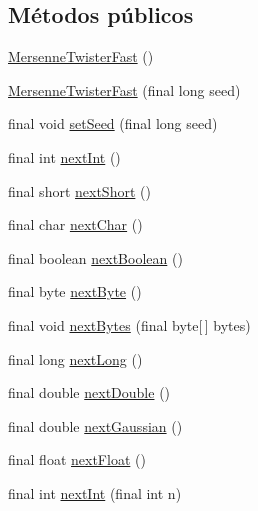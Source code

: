 \subsection*{Métodos públicos}
\begin{DoxyCompactItemize}
\item 
\hyperlink{classjenes_1_1utils_1_1_mersenne_twister_fast_a7321af0f92bcda7c245ebfbb647f7e4c}{Mersenne\-Twister\-Fast} ()
\item 
\hyperlink{classjenes_1_1utils_1_1_mersenne_twister_fast_a554aee5d390bb57ad30577b194c8b7b2}{Mersenne\-Twister\-Fast} (final long seed)
\item 
final void \hyperlink{classjenes_1_1utils_1_1_mersenne_twister_fast_aa44ca1bf8e9a2f272e248ea279f1e80c}{set\-Seed} (final long seed)
\item 
final int \hyperlink{classjenes_1_1utils_1_1_mersenne_twister_fast_a063b45fa6e20a5eea9acbe45a8c48ce0}{next\-Int} ()
\item 
final short \hyperlink{classjenes_1_1utils_1_1_mersenne_twister_fast_a89d03c5b1815eff8c443ef081a869e78}{next\-Short} ()
\item 
final char \hyperlink{classjenes_1_1utils_1_1_mersenne_twister_fast_a8f7cb8ea9832581729660f5c0346ee3a}{next\-Char} ()
\item 
final boolean \hyperlink{classjenes_1_1utils_1_1_mersenne_twister_fast_a54fa48ab055886a90aefdcb816257f4b}{next\-Boolean} ()
\item 
final byte \hyperlink{classjenes_1_1utils_1_1_mersenne_twister_fast_a5e7c0943fcc746a30277f0e09abbf60f}{next\-Byte} ()
\item 
final void \hyperlink{classjenes_1_1utils_1_1_mersenne_twister_fast_a237dc55841fd8bf544106d052833c374}{next\-Bytes} (final byte\mbox{[}$\,$\mbox{]} bytes)
\item 
final long \hyperlink{classjenes_1_1utils_1_1_mersenne_twister_fast_a1de4f36e5e4035569bbb79bb06d4e9c7}{next\-Long} ()
\item 
final double \hyperlink{classjenes_1_1utils_1_1_mersenne_twister_fast_a64238ab497c1e504c798355f682ea2b9}{next\-Double} ()
\item 
final double \hyperlink{classjenes_1_1utils_1_1_mersenne_twister_fast_a4af0dd9a4366e476e4d45568cbb558e9}{next\-Gaussian} ()
\item 
final float \hyperlink{classjenes_1_1utils_1_1_mersenne_twister_fast_af2d30f1dec2a94ca26a3b1ccc0624ce9}{next\-Float} ()
\item 
final int \hyperlink{classjenes_1_1utils_1_1_mersenne_twister_fast_ae66ea69e37e4866fbb3beecb4e66577a}{next\-Int} (final int n)
\end{DoxyCompactItemize}
